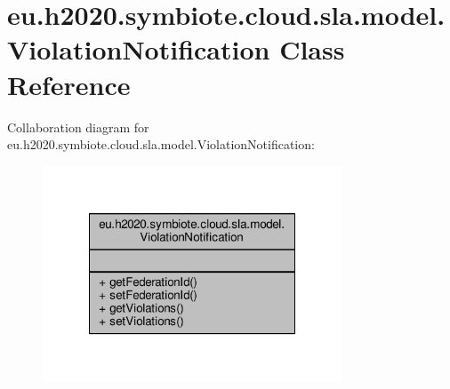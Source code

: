 \hypertarget{classeu_1_1h2020_1_1symbiote_1_1cloud_1_1sla_1_1model_1_1ViolationNotification}{}\section{eu.\+h2020.\+symbiote.\+cloud.\+sla.\+model.\+Violation\+Notification Class Reference}
\label{classeu_1_1h2020_1_1symbiote_1_1cloud_1_1sla_1_1model_1_1ViolationNotification}


Collaboration diagram for eu.\+h2020.\+symbiote.\+cloud.\+sla.\+model.\+Violation\+Notification\+:\nopagebreak
\begin{figure}[H]
\begin{center}
\leavevmode
\includegraphics[width=252pt]{classeu_1_1h2020_1_1symbiote_1_1cloud_1_1sla_1_1model_1_1ViolationNotification__coll__graph}
\end{center}
\end{figure}
